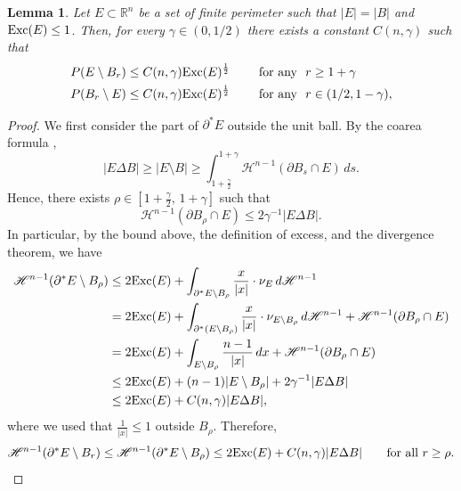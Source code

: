 \documentclass[reqno,11pt]{amsart}
\makeatletter
\newtheorem{lem}[thm]{Lemma}%
\numberwithin{equation}{section}
\theoremstyle{remark}
\makeatother
\begin{document}
\begin{lem}\label{small tentacle excess}
Let $E\subset \mathbb R^n$ be a set of finite perimeter such that $|E|=|B|$ and ${\rm Exc}(E)\leq 1$.
Then, for every $\gamma \in (0,1/2)$ there exists a constant $C(n,\gamma)$ such that 
\begin{align*}
&P(E\setminus B_{r})\le C(n,\gamma) {\rm Exc}(E)^{\frac{1}2} \qquad \text{ for any } \ r \geq 1+\gamma \\
&P( B_{r} \setminus E)\le C(n,\gamma) {\rm Exc}(E)^{\frac{1}2} \qquad  \text{ for any } \ r \in (1/2,1-\gamma),
\end{align*}
\end{lem}
\begin{proof}
We first consider the part of $\partial^*E$ outside the unit ball.   
By the coarea formula \cite[Theorem 1, Section 3.4.2]{EG1992},  
$$|E\Delta B|\ge  \left|  E\setminus  B   \right|\ge \int_{1+\frac \gamma 2}^{1+\gamma} \mathscr H^{n-1}(  \partial B_s\cap E)\, ds.$$
Hence, there exists $\rho\in [1+\frac \gamma 2,\,1+  \gamma]$ such that
$$\mathscr H^{n-1}(  \partial B_{\rho}\cap E)\le  2 \gamma^{-1}|E\Delta B|.$$
In particular, by the bound above, the definition of excess, and the divergence theorem, we have
\begin{equation}
\label{eq:bound coarea1}
\begin{split}
\mathscr H^{n-1}(\partial^*E \setminus B_{\rho}) &\leq 2 {\rm Exc}(E)+ \int_{\partial^*E \setminus B_{\rho}} \frac{x}{|x|}\cdot \nu_E \,d\mathscr H^{n-1}\\
&=2 {\rm Exc}(E)+ \int_{\partial^*(E \setminus B_{\rho})} \frac{x}{|x|} \cdot \nu_{E \setminus B_{\rho}}\,d\mathscr H^{n-1}+\mathscr H^{n-1}(\partial B_\rho \cap E)\\
&=2 {\rm Exc}(E)+ \int_{E \setminus B_{\rho}} \frac{n-1}{|x|} \,dx+\mathscr H^{n-1}(\partial B_\rho \cap E)\\
&\leq 2 {\rm Exc}(E)+ (n-1)|E \setminus B_{\rho}| +2\gamma^{-1}|E\Delta B|\\
&\leq 2 {\rm Exc}(E)+ C(n,\gamma)|E \Delta B|,
\end{split}
\end{equation}
where we used that $\frac{1}{|x|} \leq 1$ outside $B_\rho$. 
Therefore,
$$
\mathscr H^{n-1}(\partial^*E \setminus B_{r}) \leq \mathscr H^{n-1}(\partial^*E \setminus B_{\rho}) \leq 2 {\rm Exc}(E)+ C(n,\gamma)|E \Delta B| \qquad \text{for all }r \geq \rho.
$$
\end{proof}
\end{document}
